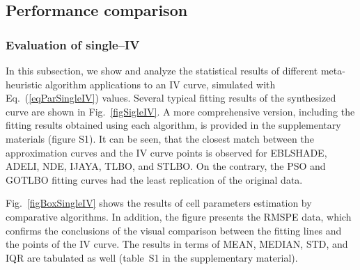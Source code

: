 \documentclass[a4paper,fleqn]{cas-sc}
\begin{document}

\subsection{Performance comparison}

\subsubsection{Evaluation of single--IV}

In this subsection, we show and analyze the statistical results of different meta-heuristic algorithm
applications to an IV curve, simulated with Eq.~(\ref{eqParSingleIV}) values.
Several typical fitting results of the synthesized curve are shown in Fig.~\ref{figSigleIV}.
A more comprehensive version, including the fitting results obtained using each algorithm,
is provided in the supplementary materials (figure S1).
It can be seen, that the closest match between the approximation curves and the IV curve points is
observed for EBLSHADE, ADELI, NDE, IJAYA, TLBO, and STLBO.
On the contrary, the PSO and GOTLBO fitting curves had the least replication of the original data.

Fig.~\ref{figBoxSingleIV} shows the results of cell parameters estimation by comparative algorithms.
In addition, the figure presents the RMSPE data,
which confirms the conclusions of the visual comparison between the fitting lines and the points of the IV curve.
The results in terms of MEAN, MEDIAN, STD, and IQR are tabulated as well (table~S1 in the supplementary material).
\end{document}

